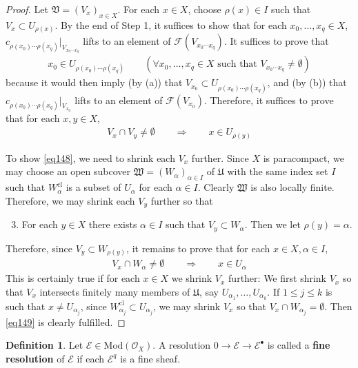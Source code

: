 \documentclass[12pt,b5paper,notitlepage]{report}
\theoremstyle{definition}
\newtheorem{df}{Definition}[section]
\theoremstyle{plain}
\newcommand{\fk}{\mathfrak}
\newcommand{\scr}{\mathscr}
\newcommand{\blt}{\bullet}
\newcommand{\cl}{\mathrm{cl}}
\newcommand{\Mod}{\mathrm{Mod}}
\numberwithin{equation}{section}
\begin{document}
\begin{proof}
Let $\fk V=(V_x)_{x\in X}$. For each $x\in X$, choose $\rho(x)\in I$ such that $V_x\subset U_{\rho(x)}$. By the end of Step 1, it suffices to show that for each $x_0,\dots,x_q\in X$, $c_{\rho(x_0)\cdots\rho(x_q)}|_{V_{x_0\cdots x_q}}$ lifts to an element of $\scr F(V_{x_0\cdots x_q})$. It suffices to prove that
\begin{align*}
x_0\in U_{\rho(x_0)\cdots\rho(x_q)}\qquad (\forall x_0,\dots,x_q\in X\text{ such that }V_{x_0\cdots x_q}\neq\emptyset)
\end{align*}
because it would then imply (by (a)) that $V_{x_0}\subset U_{\rho(x_0)\cdots\rho(x_q)}$, and (by (b)) that $c_{\rho(x_0)\cdots\rho(x_q)}|_{V_{x_0}}$ lifts to an element of $\scr F(V_{x_0})$. Therefore, it suffices to prove that for each $x,y\in X$,
\begin{align}
V_x\cap V_y\neq\emptyset\qquad\Longrightarrow \qquad x\in U_{\rho(y)} \label{eq148}
\end{align}

To show \eqref{eq148}, we need to shrink each $V_x$ further. Since $X$ is paracompact, we may choose an open subcover $\fk W=(W_\alpha)_{\alpha\in I}$ of $\fk U$ with the same index set $I$ such that $W_\alpha^\cl$ is a subset of $U_\alpha$ for each $\alpha\in I$. Clearly $\fk W$ is also locally finite. Therefore, we may shrink each $V_y$ further so that
\begin{enumerate}[label=(\alph*)] \setcounter{enumi}{2}
\item For each $y\in X$ there exists $\alpha\in I$ such that $V_y\subset W_\alpha$. Then we let $\rho(y)=\alpha$.
\end{enumerate}
Therefore, since $V_y\subset W_{\rho(y)}$, it remains to prove that for each $x\in X,\alpha\in I$,
\begin{align}
V_x\cap W_\alpha\neq\emptyset\qquad\Longrightarrow \qquad x\in U_\alpha \label{eq149}
\end{align}
This is certainly true if for each $x\in X$ we shrink $V_x$ further: We first shrink $V_x$ so that $V_x$ intersects finitely many members of $\fk U$, say $U_{\alpha_1},\dots,U_{\alpha_k}$. If $1\leq j\leq k$ is such that $x\neq U_{\alpha_j}$, since $W_{\alpha_j}^\cl\subset U_{\alpha_j}$, we may shrink $V_x$ so that $V_x\cap W_{\alpha_j}=\emptyset$. Then \eqref{eq149} is clearly fulfilled.
\end{proof}



\begin{df}
Let $\scr E\in\Mod(\scr O_X)$. A resolution $0\rightarrow\scr E\rightarrow\scr E^\blt$ is called a \textbf{fine resolution}   of $\scr E$ if each $\scr E^q$ is a fine sheaf.
\end{df}
\end{document}
